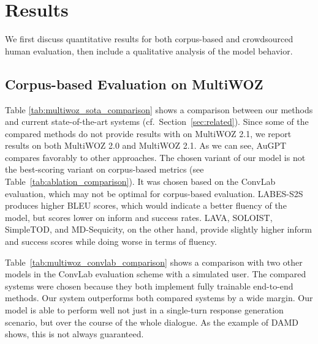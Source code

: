 \documentclass[11pt]{article}
\newcommand{\multiwoz}[0]{MultiWOZ 2.0\xspace}
\newcommand{\multiwozn}[0]{MultiWOZ 2.1\xspace}
\newcommand{\augpt}[0]{AuGPT\xspace}
\begin{document}
\section{Results}
\label{sec:results}

We first discuss quantitative results for both corpus-based and crowdsourced human evaluation, then
include a qualitative analysis of the model behavior.

\subsection{Corpus-based Evaluation on MultiWOZ}

Table \ref{tab:multiwoz_sota_comparison} shows a comparison between our methods and current state-of-the-art systems (cf.~Section~\ref{sec:related}).
Since some of the compared methods do not provide results with on \multiwozn, we report results on both \multiwoz and MultiWOZ 2.1.
As we can see, \augpt compares favorably to other approaches.
The chosen variant of our model is not the best-scoring variant on corpus-based metrics (see Table~\ref{tab:ablation_comparison}). It was chosen based on the ConvLab evaluation, which may not be optimal for corpus-based evaluation.
LABES-S2S produces higher BLEU scores, which would indicate a better fluency of the model, but scores lower on inform and success rates.
LAVA, SOLOIST, SimpleTOD, and MD-Sequicity, on the other hand, provide slightly higher inform and success scores while doing worse in terms of fluency.

Table~\ref{tab:multiwoz_convlab_comparison} shows a comparison with two other models in the ConvLab evaluation scheme with a simulated user. The compared systems were chosen because they both implement fully trainable end-to-end methods. Our system outperforms both compared systems by a wide margin. Our model is able to perform well not just in a single-turn response generation scenario, but over the course of the whole dialogue. As the example of DAMD shows, this is not always guaranteed.
\end{document}
